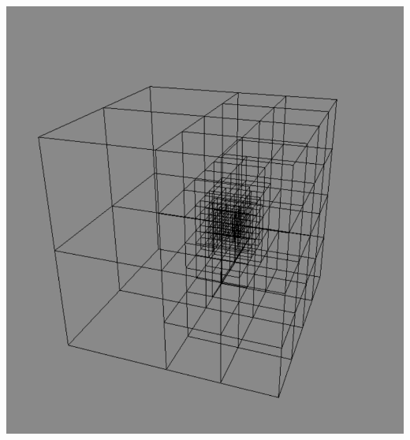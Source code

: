 \documentclass[mathserif, 10pt]{beamer}
\begin{document}
\begin{frame}
\begin{columns}
\begin{column}[b]{0.6\linewidth}
        \includegraphics[scale=0.1192]{figures/adapgrid.pdf}\\
	\ \\
    \end{column}
    \end{columns}
\end{frame}
\end{document}
